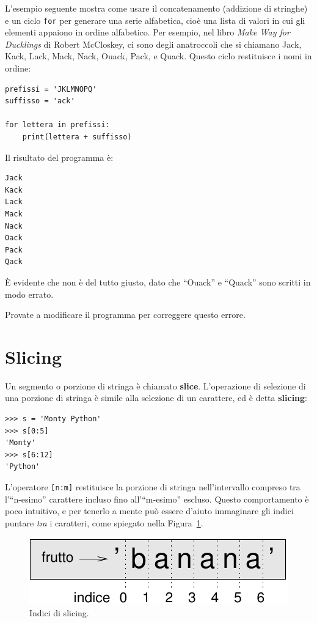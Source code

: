 \documentclass[10pt]{book}
\begin{document}
L'esempio seguente mostra come usare il concatenamento (addizione di stringhe) e un ciclo {\tt for} per generare una serie alfabetica, cioè una lista di valori in cui gli elementi appaiono in ordine alfabetico. Per esempio, nel libro {\em Make Way for Ducklings} di Robert McCloskey, ci sono degli anatroccoli che si chiamano Jack, Kack, Lack, Mack, Nack, Ouack, Pack, e Quack.  Questo ciclo restituisce i nomi in ordine:

\begin{verbatim}
prefissi = 'JKLMNOPQ'
suffisso = 'ack'

for lettera in prefissi:
    print(lettera + suffisso)
\end{verbatim}
%
Il risultato del programma è:

\begin{verbatim}
Jack
Kack
Lack
Mack
Nack
Oack
Pack
Qack
\end{verbatim}
%
È evidente che non è del tutto giusto, dato che ``Ouack'' e ``Quack'' sono scritti in modo errato.

Provate a modificare il programma per correggere questo errore.


\section{Slicing}
\label{slice}

Un segmento o porzione di stringa è chiamato {\bf slice}. L'operazione di selezione di una porzione di stringa è simile alla selezione di un carattere, ed è detta {\bf slicing}:

\begin{verbatim}
>>> s = 'Monty Python'
>>> s[0:5]
'Monty'
>>> s[6:12]
'Python'
\end{verbatim}
%
L'operatore {\tt [n:m]} restituisce la porzione di stringa nell'intervallo compreso tra l'``n-esimo'' carattere incluso fino all'``m-esimo'' escluso. Questo comportamento è poco intuitivo, e per tenerlo a mente può essere d'aiuto immaginare gli indici puntare {\em tra} i caratteri, come spiegato nella Figura~\ref{fig.banana}.

\begin{figure}
\centerline
{\includegraphics[scale=0.8]{figs/banana.pdf}}
\caption{Indici di slicing.}
\label{fig.banana}
\end{figure}
\end{document}
